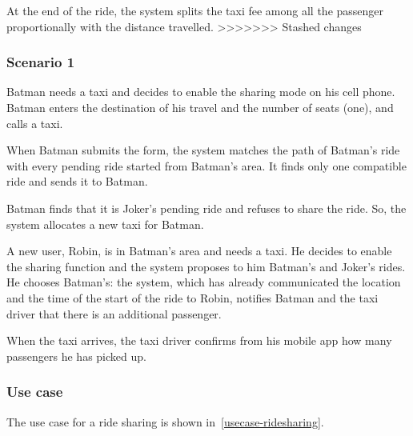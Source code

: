 At the end of the ride, the system splits the taxi fee among all the passenger proportionally with the distance travelled.
>>>>>>> Stashed changes

\subsubsection{Scenario 1}
Batman needs a taxi and decides to enable the sharing mode on his cell phone. Batman enters the destination of his travel and the number of seats (one), and calls a taxi.

When Batman submits the form, the system matches the path of Batman's ride with every pending ride started from Batman's area. It finds only one compatible ride and sends it to Batman.

Batman finds that it is Joker's pending ride and refuses to share the ride.
So, the system allocates a new taxi for Batman.

A new user, Robin, is in Batman's area and needs a taxi. He decides to enable the sharing function and the system proposes to him Batman's and Joker's rides.
He chooses Batman's: the system, which has already communicated the location and the time of the start of the ride to Robin, notifies Batman and the taxi driver that there is an additional passenger.

When the taxi arrives, the taxi driver confirms from his mobile app how many passengers he has picked up.

\subsubsection{Use case}
The use case for a ride sharing is shown in~\autoref{usecase-ridesharing}.

